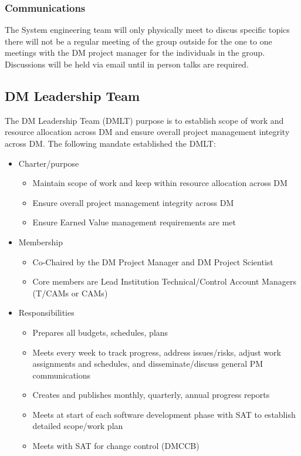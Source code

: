  \subsubsection{Communications} 
 The System engineering team will only physically meet to discus specific topics there will not be a regular meeting of the group outside for the one to one meetings with the DM project manager for the individuals in the group. 
Discussions will be held via email until in person talks are required. 

\subsection{DM Leadership Team} \label{sect:dmlt}

The DM Leadership Team (DMLT) purpose is to establish scope of work and resource allocation across DM and ensure overall project management integrity across DM.
The following mandate established the DMLT:

\begin{itemize}
\item Charter/purpose
	\begin{itemize}
	\item Maintain scope of work and keep within resource allocation across DM
	\item Ensure overall project management integrity across DM
	\item Ensure Earned Value management requirements are met
	\end{itemize}
\item Membership
	\begin{itemize}
	\item Co-Chaired by the DM Project Manager  and  DM Project Scientist
	\item Core members are Lead Institution Technical/Control Account Managers (T/CAMs or CAMs)
	\end{itemize}
\item Responsibilities
	\begin{itemize}
	\item Prepares all budgets, schedules, plans
	\item Meets every week to track progress, address issues/risks, adjust work assignments and schedules, and disseminate/discuss general PM communications
	\item Creates and publishes monthly, quarterly, annual progress reports
	\item Meets at start of each software development phase with SAT to establish detailed scope/work plan
	\item Meets with SAT for change control (DMCCB)
	\end{itemize}
\end{itemize}

